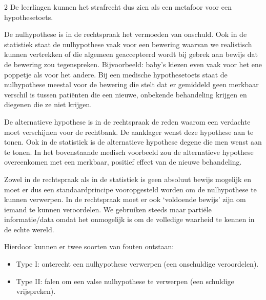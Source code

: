 \begin{multicols}{2}
 De leerlingen kunnen het strafrecht dus zien als een metafoor voor een hypothesetoets.
 
 De nulhypothese is in de rechtspraak het vermoeden van onschuld. 
 Ook in de statistiek staat de nulhypothese vaak voor een bewering waarvan we realistisch kunnen vertrekken of die algemeen geaccepteerd wordt bij gebrek aan bewijs dat de bewering zou tegenspreken. Bijvoorbeeld: baby's kiezen even vaak voor het ene poppetje als voor het andere. Bij een medische hypothesetoets staat de nulhypothese meestal voor de bewering die stelt dat er gemiddeld geen merkbaar verschil is tussen pati\"enten die een nieuwe, onbekende behandeling krijgen en diegenen die ze niet krijgen.

 De alternatieve hypothese is in de rechtspraak de reden waarom een verdachte moet verschijnen voor de rechtbank. De aanklager wenst deze hypothese aan te tonen. Ook in de statistiek is de alternatieve hypothese degene die men wenst aan te tonen. In het bovenstaande medisch voorbeeld zou de alternatieve hypothese overeenkomen met een merkbaar, positief effect van de nieuwe behandeling.

 Zowel in de rechtspraak als in de statistiek is geen absoluut bewijs mogelijk en moet er dus een standaardprincipe vooropgesteld worden om de nulhypothese te kunnen verwerpen. In de rechtspraak moet er ook `voldoende bewijs' zijn om iemand te kunnen veroordelen. We gebruiken  steeds maar parti\"ele informatie/data omdat het onmogelijk is om de volledige waarheid te kennen in de echte wereld.
 
 Hierdoor kunnen er twee soorten van fouten ontstaan:
 \begin{itemize}
\item Type I: onterecht een nulhypothese verwerpen (een onschuldige veroordelen).
\item Type II: falen om een valse nulhypothese te verwerpen (een schuldige vrijspreken).
 \end{itemize}

\vfill\null %
\columnbreak



\end{multicols}
